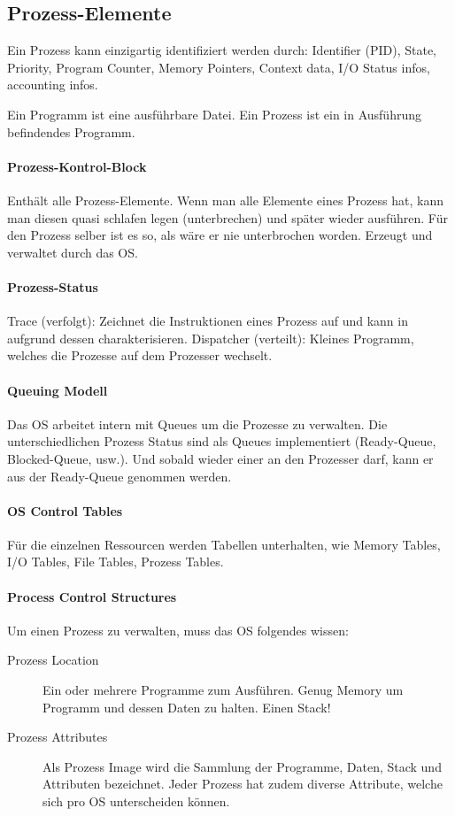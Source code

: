 \subsection{Prozess-Elemente}
Ein Prozess kann einzigartig identifiziert werden durch: Identifier (PID), State, Priority, Program Counter, Memory Pointers, Context data, I/O Status infos, accounting infos.

Ein Programm ist eine ausführbare Datei. Ein Prozess ist ein in Ausführung befindendes Programm.

\paragraph{Prozess-Kontrol-Block} Enthält alle Prozess-Elemente. Wenn man alle Elemente eines Prozess hat, kann man diesen quasi schlafen legen (unterbrechen) und später wieder ausführen. Für den Prozess selber ist es so, als wäre er nie unterbrochen worden. Erzeugt und verwaltet durch das OS.

\paragraph{Prozess-Status} Trace (verfolgt): Zeichnet die Instruktionen eines Prozess auf und kann in aufgrund dessen charakterisieren. Dispatcher (verteilt): Kleines Programm, welches die Prozesse auf dem Prozesser wechselt.

\paragraph{Queuing Modell} Das OS arbeitet intern mit Queues um die Prozesse zu verwalten. Die unterschiedlichen Prozess Status sind als Queues implementiert (Ready-Queue, Blocked-Queue, usw.). Und sobald wieder einer an den Prozesser darf, kann er aus der Ready-Queue genommen werden.

\paragraph{OS Control Tables} Für die einzelnen Ressourcen werden Tabellen unterhalten, wie Memory Tables, I/O Tables, File Tables, Prozess Tables.

\paragraph{Process Control Structures}
Um einen Prozess zu verwalten, muss das OS folgendes wissen:
\begin{description}
	\item[Prozess Location] Ein oder mehrere Programme zum Ausführen. Genug Memory um Programm und dessen Daten zu halten. Einen Stack!
	\item[Prozess Attributes] Als Prozess Image wird die Sammlung der Programme, Daten, Stack und Attributen bezeichnet. Jeder Prozess hat zudem diverse Attribute, welche sich pro OS unterscheiden können.
\end{description}

